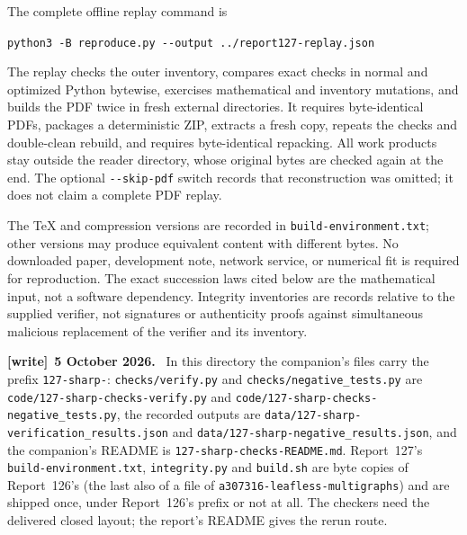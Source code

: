\documentclass[11pt,letterpaper]{article}
\theoremstyle{remark}\newtheorem{remark}[theorem]{Remark}
\numberwithin{equation}{section}
\newcommand{\file}[1]{\nolinkurl{#1}}
\newenvironment{writenote}[1][]{\par\smallskip\begingroup\small
 \noindent\textbf{[write]}\if\relax\detokenize{#1}\relax\else~\textbf{#1.}\fi\ }%
 {\par\endgroup\smallskip}
\begin{document}
The complete offline replay command is
\begin{center}
\verb|python3 -B reproduce.py --output ../report127-replay.json|
\end{center}
The replay checks the outer inventory, compares exact checks in normal
and optimized Python bytewise, exercises mathematical and inventory
mutations, and builds the PDF twice in fresh external directories.
It requires byte-identical PDFs, packages a deterministic ZIP, extracts
a fresh copy, repeats the checks and double-clean rebuild, and requires
byte-identical repacking. All work products stay outside the reader
directory, whose original bytes are checked again at the end.
The optional \verb|--skip-pdf| switch records that reconstruction
was omitted; it does not claim a complete PDF replay.

The TeX and compression versions are recorded in
\texttt{build-environment.txt}; other versions may produce equivalent
content with different bytes. No downloaded paper, development note,
network service, or numerical fit is required for reproduction.
The exact succession laws cited below are the mathematical input,
not a software dependency. Integrity inventories are records relative
to the supplied verifier, not signatures or authenticity proofs against
simultaneous malicious replacement of the verifier and its inventory.
\begin{writenote}[5 October 2026]
In this directory the companion's files carry the prefix \file{127-sharp-}: \file{checks/verify.py} and \file{checks/negative_tests.py} are \file{code/127-sharp-checks-verify.py} and \file{code/127-sharp-checks-negative_tests.py}, the recorded outputs are \file{data/127-sharp-verification_results.json} and \file{data/127-sharp-negative_results.json}, and the companion's README is \file{127-sharp-checks-README.md}. Report~127's \file{build-environment.txt}, \file{integrity.py} and \file{build.sh} are byte copies of Report~126's (the last also of a file of \file{a307316-leafless-multigraphs}) and are shipped once, under Report~126's prefix or not at all. The checkers need the delivered closed layout; the report's README gives the rerun route.
\end{writenote}

\clearpage
\end{document}
